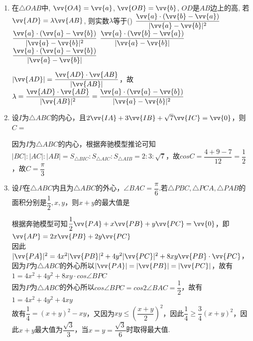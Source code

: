 \begin{enumerate}
\item 在$\triangle{OAB}$中, $\vv{OA}=\vv{a}$, $\vv{OB}=\vv{b}$, $OD$是$AB$边上的高, 若$\vv{AD}=\lambda\vv{AB}$, 则实数$\lambda$等于\dotfill()
\xx
{$\dfrac{\vv{a}\cdot(\vv{b}-\vv{a})}{\vert\vv{a}-\vv{b}\vert^2}$}
{$\dfrac{\vv{a}\cdot(\vv{a}-\vv{b})}{\vert\vv{a}-\vv{b}\vert^2}$}
{$\dfrac{\vv{a}\cdot(\vv{b}-\vv{a})}{\vert\vv{a}-\vv{b}\vert}$}
{$\dfrac{\vv{a}\cdot(\vv{a}-\vv{b})}{\vert\vv{a}-\vv{b}\vert}$}
\begin{jieda}
    $|\vv{AD}| = \dfrac{\vv{AD} \cdot \vv{AB}}{|\vv{AB}|}$，故$\lambda = \dfrac{\vv{AD} \cdot \vv{AB}}{|\vv{AB}|^2} = \dfrac{\vv{a}\cdot(\vv{a}-\vv{b})}{\vert\vv{a}-\vv{b}\vert^2}$
\end{jieda}

\item 设$I$为$\triangle{ABC}$的内心，且$2\vv{IA} + 3\vv{IB} + \sqrt{7}\vv{IC} = \vv{0}$，则$C=$
\begin{jieda}
    因为$I$为$\triangle ABC$的内心，根据奔驰模型推论可知$|BC| : |AC| : |AB|  = S_{\triangle BIC} : S_{\triangle AIC}:S_{\triangle AIB} = 2 : 3 : \sqrt{7}$，故$cos C = \dfrac{4 + 9 - 7}{12} = \dfrac{1}{2}$，故$C = \dfrac{\pi}{3}$
\end{jieda}

\item 设$P$在$\triangle ABC$内且为$\triangle ABC$的外心，$\angle BAC = \dfrac{\pi}{6}$.若$\triangle PBC, \triangle PCA, \triangle PAB$的面积分别是$\dfrac{1}{2}, x, y$，则$x+y$的最大值是
\begin{jieda}
    根据奔驰模型可知$\dfrac{1}{2}\vv{PA} + x\vv{PB} + y\vv{PC} = \vv{0}$，即$\vv{AP} = 2x\vv{PB} + 2y\vv{PC}$\\
    因此$|\vv{PA}|^2 = 4x^2|\vv{PB}|^2 + 4y^2|\vv{PC}|^2 + 8xy\vv{PB} \cdot \vv{PC}$， 因为$P$为$\triangle ABC$的外心所以$|\vv{PA}| = |\vv{PB}| = |\vv{PC}|$，故有$1 = 4x^2 + 4y^2 + 8xy \cdot cos\angle BPC$\\
    因为$P$为$\triangle ABC$的外心所以$cos\angle BPC = cos 2\angle BAC = \dfrac{1}{2}$，故有$1 = 4x^2 + 4y^2 + 4xy$\\
    故有$\dfrac{1}{4} = (x+y)^2 - xy$，又因为$xy \leq \left(\dfrac{x+y}{2}\right)^2$，因此$\dfrac{1}{4} \geq \dfrac{3}{4}(x+y)^2$，因此$x+y$最大值为$\dfrac{\sqrt{3}}{3}$，当$x = y = \dfrac{\sqrt{3}}{6}$时取得最大值.
\end{jieda}


\end{enumerate}

